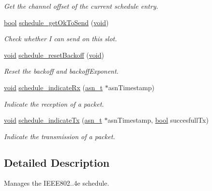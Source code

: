 \begin{DoxyCompactItemize}
\begin{DoxyCompactList}\small\item\em Get the channel offset of the current schedule entry. \end{DoxyCompactList}\item 
\hyperlink{_p_e___types_8h_a97a80ca1602ebf2303258971a2c938e2}{bool} \hyperlink{group___schedule_gab5a0194710b51bf73b6aa363cb2fd8cb}{schedule\+\_\+get\+Ok\+To\+Send} (\hyperlink{usb__devapi_8h_afabf60e7f57651d6d595a02c75f07cd0}{void})
\begin{DoxyCompactList}\small\item\em Check whether I can send on this slot. \end{DoxyCompactList}\item 
\hyperlink{usb__devapi_8h_afabf60e7f57651d6d595a02c75f07cd0}{void} \hyperlink{group___schedule_ga0d3ec70265c59fdb1ba215d67f04ec83}{schedule\+\_\+reset\+Backoff} (\hyperlink{usb__devapi_8h_afabf60e7f57651d6d595a02c75f07cd0}{void})
\begin{DoxyCompactList}\small\item\em Reset the backoff and backoff\+Exponent. \end{DoxyCompactList}\item 
\hyperlink{usb__devapi_8h_afabf60e7f57651d6d595a02c75f07cd0}{void} \hyperlink{group___schedule_gaf1980123fcc1fea95f3bcfdf63de083d}{schedule\+\_\+indicate\+Rx} (\hyperlink{structasn__t}{asn\+\_\+t} $\ast$asn\+Timestamp)
\begin{DoxyCompactList}\small\item\em Indicate the reception of a packet. \end{DoxyCompactList}\item 
\hyperlink{usb__devapi_8h_afabf60e7f57651d6d595a02c75f07cd0}{void} \hyperlink{group___schedule_gab4fc72142c898c09598ab0d0b255b794}{schedule\+\_\+indicate\+Tx} (\hyperlink{structasn__t}{asn\+\_\+t} $\ast$asn\+Timestamp, \hyperlink{_p_e___types_8h_a97a80ca1602ebf2303258971a2c938e2}{bool} succesfull\+Tx)
\begin{DoxyCompactList}\small\item\em Indicate the transmission of a packet. \end{DoxyCompactList}\end{DoxyCompactItemize}


\subsection{Detailed Description}
Manages the I\+E\+E\+E802..\+4e schedule. 


